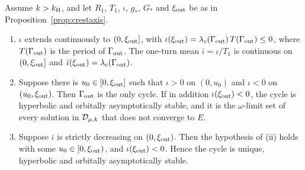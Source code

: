 \begin{proposition}\label{neg:prop:signchange}
Assume $k>k_{\mathrm H}$, and let $R_1$, $T_1$, $\iota$, $g_\ast$, $G_\ast$ and $\xi_{\rm out}$ be as in Proposition~\ref{prop:crestaxis}.
\begin{enumerate}[label=\textup{(\roman*)}]
\item $\iota$ extends continuously to $(0,\xi_{\rm out}]$, with $\iota(\xi_{\rm out})=\lambda_c(\Gamma_{\rm out})\,T(\Gamma_{\rm out})\le0$, where $T(\Gamma_{\rm out})$ is the period of $\Gamma_{\rm out}$. The one-turn mean $\bar\iota=\iota/T_1$ is continuous on $(0,\xi_{\rm out}]$ and $\bar\iota(\xi_{\rm out})=\lambda_c(\Gamma_{\rm out})$.
\item Suppose there is $u_0\in[0,\xi_{\rm out}]$ such that $\iota>0$ on $(0,u_0)$ and $\iota<0$ on $(u_0,\xi_{\rm out})$. Then $\Gamma_{\rm out}$ is the only cycle. If in addition $\iota(\xi_{\rm out})<0$, the cycle is hyperbolic and orbitally asymptotically stable, and it is the $\omega$-limit set of every solution in $\mathcal D_{\mu,k}$ that does not converge to $E$.
\item Suppose $\bar\iota$ is strictly decreasing on $(0,\xi_{\rm out})$. Then the hypothesis of \textup{(ii)} holds with some $u_0\in[0,\xi_{\rm out})$, and $\iota(\xi_{\rm out})<0$. Hence the cycle is unique, hyperbolic and orbitally asymptotically stable.
\end{enumerate}
\end{proposition}
